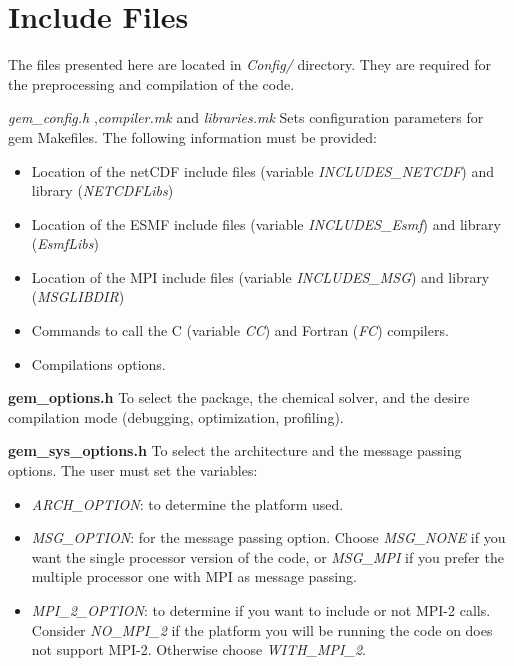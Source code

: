 \chapter[Include Files]{Include Files} \label{chap:inc_files}

The files presented here are located in {\em Config/} directory.
They are required for the preprocessing and compilation of the
code. 

\vskip 0.5cm
\noindent
{\em gem\_config.h} ,{\em compiler.mk} and {\em libraries.mk}
\newline
Sets configuration parameters for gem Makefiles.
The following information must be provided:
\begin{itemize}
\item Location of the netCDF include files (variable {\em INCLUDES\_NETCDF}) 
      and library ({\em NETCDFLibs})
\item Location of the ESMF include files (variable {\em INCLUDES\_Esmf}) 
      and library ({\em EsmfLibs})
\item Location of the MPI include files (variable {\em INCLUDES\_MSG})
      and library ({\em MSGLIBDIR})
\item Commands to call the C (variable {\em CC}) and Fortran ({\em FC})
      compilers.
\item Compilations options.
\end{itemize}


\vskip 0.5cm
\noindent
{\bf gem\_options.h}
\newline
To select the package, the chemical solver, and the desire
compilation mode (debugging, optimization, profiling).


\vskip 0.5cm
\noindent
{\bf gem\_sys\_options.h}
\newline
To select the architecture and the message passing options.
The user must set the variables:
\begin{itemize}
\item {\em ARCH\_OPTION}: to determine the platform used.
\item {\em MSG\_OPTION}: for the message passing option.
      Choose {\em MSG\_NONE} if you want the single processor
      version of the code, or {\em MSG\_MPI} if you prefer
      the multiple processor one with MPI as message passing.
\item {\em MPI\_2\_OPTION}: to determine if you want to include
      or not MPI-2 calls. Consider {\em NO\_MPI\_2} if the platform
      you will be running the code on does not support MPI-2.
      Otherwise choose {\em WITH\_MPI\_2}.
\end{itemize}

